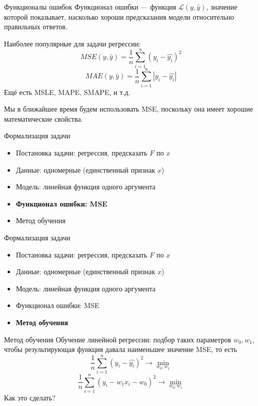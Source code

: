 \documentclass[aspectratio=169]{beamer}
\begin{document}
\begin{frame}{Функционалы ошибок}
    Функционал ошибки --- функция \( \mathcal{L}(y, \hat{y}) \), значение
    которой показывает, насколько хороши предсказания модели относительно
    правильных ответов.
    \pause

    Наиболее популярные для задачи регрессии:
    {\large
        \[ MSE(y, \hat{y}) = \frac{1}{n} \sum_{i=1}^n {(y_i - \hat{y_i})}^2 \]
        \[ MAE (y, \hat{y}) = \frac{1}{n} \sum_{i=1}^n {|y_i - \hat{y_i}|} \]
    }
    Ещё есть MSLE, MAPE, SMAPE, и т.д.

    Мы в ближайшее время будем использовать MSE, поскольку она имеет хорошие
    математические свойства.
\end{frame}

\begin{frame}{Формализация задачи}
    \begin{itemize}
        \item Постановка задачи: регрессия, предсказать \( F \) по \( x \)
        \item Данные: одномерные (единственный признак \( x \))
        \item Модель: линейная функция одного аргумента
        \item \textbf{Функционал ошибки: MSE}
        \item Метод обучения
    \end{itemize}
\end{frame}

\begin{frame}{Формализация задачи}
    \begin{itemize}
        \item Постановка задачи: регрессия, предсказать \( F \) по \( x \)
        \item Данные: одномерные (единственный признак \( x \))
        \item Модель: линейная функция одного аргумента
        \item Функционал ошибки: MSE
        \item \textbf{Метод обучения}
    \end{itemize}
\end{frame}

\begin{frame}{Метод обучения}
    Обучение линейной регрессии: подбор таких параметров \( w_0, w_1 \), чтобы результирующая
    функция давала наименьшее значение MSE, то есть
    {\Large
        \[ \frac{1}{n} \sum_{i=1}^n {(y_i - \hat{y_i})}^2 \rightarrow \min_{w_0, w_1} \]
        \pause
        \[ \frac{1}{n} \sum_{i=1}^n {(y_i - w_1 x_i - w_0 )}^2 \rightarrow \min_{w_0, w_1} \]
    }
    Как это сделать?
\end{frame}
\end{document}
